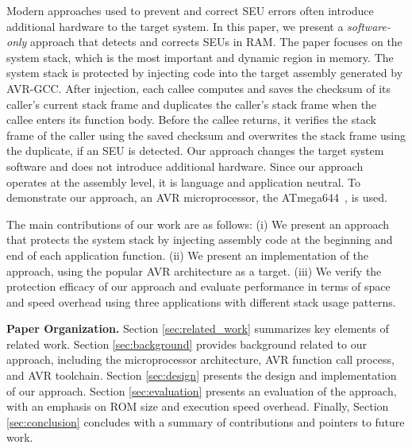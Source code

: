 Modern approaches used to prevent and correct SEU errors often introduce additional hardware to the target system. In this paper, we present a {\em software-only} approach that detects and corrects SEUs in RAM. The paper focuses on the system stack, which is the most important and dynamic region in memory. The system stack is protected by injecting code into the target assembly generated by AVR-GCC. After injection, each callee computes and saves the checksum of its caller's current stack frame and duplicates the caller's stack frame when the callee enters its function body. Before the callee returns, it verifies the stack frame of the caller using the saved checksum and overwrites the stack frame using the duplicate, if an SEU is detected. Our approach changes the target system software and does not introduce additional hardware. Since our approach operates at the assembly level, it is language and application neutral. To demonstrate our approach, an AVR microprocessor, the ATmega644~\cite{atmel:avr}, is used. 

The main contributions of our work are as follows: (i) We present an approach that protects the system stack by injecting assembly code at the beginning and end of each application function. (ii) We present an implementation of the approach, using the popular AVR architecture as a target. (iii) We verify the protection efficacy of our approach and evaluate performance in terms of space and speed overhead using three applications with different stack usage patterns.

{\bf Paper Organization.} Section \ref{sec:related_work} summarizes key elements of related work. Section \ref{sec:background} provides background related to our approach, including the microprocessor architecture, AVR function call process, and AVR toolchain. Section \ref{sec:design} presents the design and implementation of our approach. Section \ref{sec:evaluation} presents an evaluation of the approach, with an emphasis on ROM size and execution speed overhead. Finally, Section \ref{sec:conclusion} concludes with a summary of contributions and pointers to future work.
